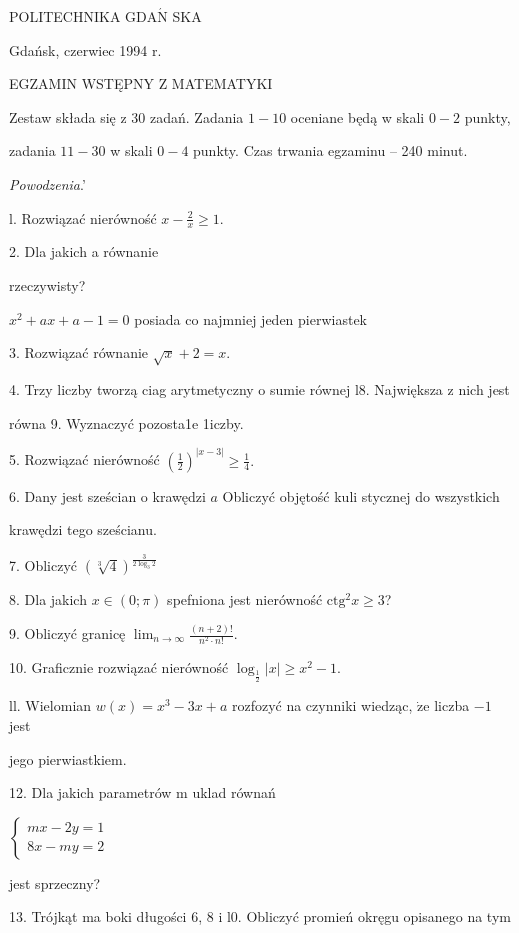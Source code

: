 \documentclass[a4paper,12pt]{article}
\begin{document}
POLITECHNIKA $\mathrm{G}\mathrm{D}\mathrm{A}\acute{\mathrm{N}}$ SKA

Gdańsk, czerwiec 1994 r.

EGZAMIN WSTĘPNY Z MATEMATYKI

Zestaw składa się z 30 zadań. Zadania $1-10$ oceniane będą w skali $0-2$ punkty,

zadania $11-30$ w skali $0-4$ punkty. Czas trwania egzaminu -- 240 minut.

{\it Powodzenia}.'

l. Rozwiązać nierówność $x-\displaystyle \frac{2}{x}\geq 1.$

2. Dla jakich a równanie

rzeczywisty?

$x^{2}+ax+a-1=0$ posiada co najmniej jeden pierwiastek

3. Rozwiązać równanie $\sqrt{x}+2=x.$

4. Trzy liczby tworzą ciag arytmetyczny o sumie równej l8. Największa z nich jest

równa 9. Wyznaczyć pozosta1e 1iczby.

5. Rozwiązać nierówność $(\displaystyle \frac{1}{2})^{|x-3|}\geq\frac{1}{4}.$

6. Dany jest sześcian o krawędzi $a$ Obliczyć objętość kuli stycznej do wszystkich

krawędzi tego sześcianu.

7. Obliczyć $(\sqrt[3]{4})^{\frac{3}{2\log_{3}2}}$

8. Dla jakich $x\in(0;\pi)$ spefniona jest nierówność $\mathrm{c}\mathrm{t}\mathrm{g}^{2}x\geq 3$?

9. Obliczyć granicę $\displaystyle \lim_{n\rightarrow\infty}\frac{(n+2)!}{n^{2}\cdot n!}.$

10. Graficznie rozwiązać nierówność $\log_{\frac{1}{2}}|x|\geq x^{2}-1.$

ll. Wielomian $w(x)=x^{3}-3x+a$ rozfozyć na czynniki wiedząc, $\dot{\mathrm{z}}\mathrm{e}$ liczba $-1$ jest

jego pierwiastkiem.

12. Dla jakich parametrów m uklad równań

$\left\{\begin{array}{l}
mx-2y=1\\
8x-my=2
\end{array}\right.$

jest sprzeczny?

13. Trójkąt ma boki długości 6, 8 i l0. Obliczyć promień okręgu opisanego na tym
\end{document}
